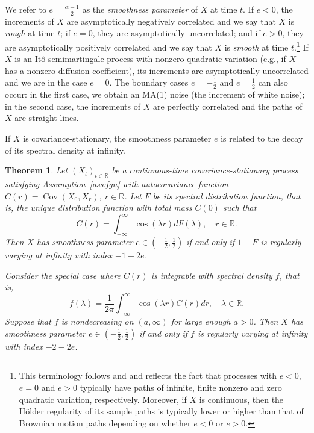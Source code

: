 \documentclass[ecta,nameyear,draft]{econsocart}
\newtheorem{theorem}{Theorem}[section]
\newcommand{\1}{\mathbf 1}
\DeclareMathOperator{\Cov}{Cov}
\numberwithin{equation}{section}
\newcommand{\R}{\mathbb{R}}
\newcommand{\la}{{\lambda}}
\begin{document}
We refer to $e=\frac{\alpha-1}2$ as the \emph{smoothness parameter} of $X$ at time $t$. If $e<0$, the increments of $X$ are asymptotically negatively correlated and we say that $X$ is \emph{rough} at time $t$; if $e=0$, they are asymptotically uncorrelated; and if $e>0$, they are asymptotically positively correlated and we say that $X$ is  \emph{smooth} at time $t$.\footnote{This terminology follows \cite{gatheral2018volatility} and \cite{chong2024nonparametric} and reflects the fact that processes with $e<0$, $e=0$ and $e>0$ typically have paths of infinite, finite nonzero and zero quadratic variation, respectively. Moreover, if $X$ is continuous, then the H\"older regularity of its sample paths is typically lower or higher than that of Brownian motion paths depending on whether $e<0$ or $e>0$.}
If $X$ is an It\^o semimartingale process with nonzero quadratic variation (e.g., if $X$ has a nonzero diffusion coefficient), its increments are asymptotically uncorrelated  and we are in the case $e=0$. The boundary cases $e=-\frac12$ and $e=\frac12$ can also occur: in the first case, we obtain an MA(1) noise (the increment of white noise); in the second case, the increments of $X$ are perfectly correlated and the paths of $X$ are straight lines.
 
 If $X$ is  covariance-stationary, the smoothness parameter $e$ is related to the decay of its spectral density at infinity.
 \begin{theorem}\label{thm:sd} Let $(X_t)_{t\in\mathbb{R}}$ be a continuous-time covariance-stationary process satisfying Assumption~\ref{ass:fgn} with autocovariance function $C(r) = \Cov(X_0,X_r)$, $r\in\mathbb{R}$. Let $F$ be its spectral distribution function, that is, the unique distribution function with total mass $C(0)$ such that
 	\[ C(r) = \int_{-\infty}^\infty \cos(\la r) dF(\la),\quad r\in\R. \]
 Then $X$ has smoothness parameter $e\in(-\frac12,\frac12)$ if and only if $1-F$ is regularly varying at infinity with index $-1-2e$.
 	
Consider the special case where $C(r)$ is integrable with spectral density $f$, that is,
\[f(\lambda) = \frac{1}{2\pi}\int_{-\infty}^\infty \cos(\la r) C(r)dr,\quad \lambda\in\mathbb{R}.\]
Suppose that $f$ is nondecreasing on $(a,\infty)$ for large enough $a>0$.
Then $X$ has smoothness parameter $e\in(-\frac12,\frac12)$ if and only if $f$ is regularly varying at infinity with index $-2-2e$.
 \end{theorem}
\end{document}
